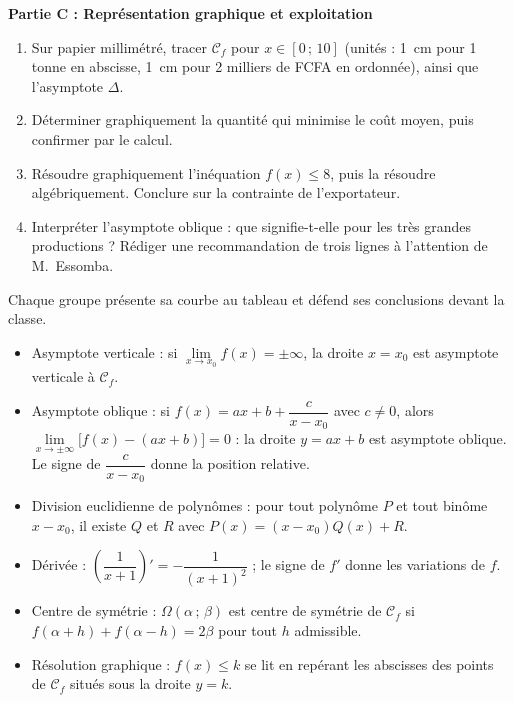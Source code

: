 \documentclass[11pt]{article}
\newcommand{\cle}[1]{{\popxbold\color{popdark}#1}}
\newcounter{popsec}
\newcounter{popsub}
\newcommand{\courssub}[1]{%
  \stepcounter{popsub}%
  \par\vspace{9pt}\noindent{\popxbold\fontsize{11.5}{13}\selectfont\color{popink}{\color{poporange}\thepopsec.\thepopsub}\hspace{6pt}#1}\par\nopagebreak\vspace{4pt}
}
\begin{document}
\textbf{Partie C : Représentation graphique et exploitation}
\begin{enumerate}[resume]
\item Sur papier millimétré, tracer $\mathcal{C}_f$ pour $x \in [0\,;\,10]$ (unités : 1~cm pour 1 tonne en abscisse, 1~cm pour 2 milliers de FCFA en ordonnée), ainsi que l'asymptote $\Delta$.
\item Déterminer graphiquement la quantité qui minimise le coût moyen, puis confirmer par le calcul.
\item Résoudre graphiquement l'inéquation $f(x) \leq 8$, puis la résoudre algébriquement. Conclure sur la contrainte de l'exportateur.
\item Interpréter l'asymptote oblique : que signifie-t-elle pour les très grandes productions ? Rédiger une recommandation de trois lignes à l'attention de M.~Essomba.
\end{enumerate}

Chaque groupe présente sa courbe au tableau et défend ses conclusions devant la classe.

\courssub{Ressources à mobiliser}

\begin{aretenir}
\begin{itemize}
\item \cle{Asymptote verticale} : si $\lim\limits_{x \to x_0} f(x) = \pm\infty$, la droite $x = x_0$ est asymptote verticale à $\mathcal{C}_f$.
\item \cle{Asymptote oblique} : si $f(x) = ax+b+\dfrac{c}{x - x_0}$ avec $c \neq 0$, alors $\lim\limits_{x \to \pm\infty} \big[f(x) - (ax+b)\big] = 0$ : la droite $y = ax+b$ est asymptote oblique. Le signe de $\dfrac{c}{x-x_0}$ donne la position relative.
\item \cle{Division euclidienne} de polynômes : pour tout polynôme $P$ et tout binôme $x - x_0$, il existe $Q$ et $R$ avec $P(x) = (x - x_0)Q(x) + R$.
\item \cle{Dérivée} : $\left(\dfrac{1}{x+1}\right)' = -\dfrac{1}{(x+1)^2}$ ; le signe de $f'$ donne les variations de $f$.
\item \cle{Centre de symétrie} : $\Omega(\alpha\,;\,\beta)$ est centre de symétrie de $\mathcal{C}_f$ si $f(\alpha + h) + f(\alpha - h) = 2\beta$ pour tout $h$ admissible.
\item \cle{Résolution graphique} : $f(x) \leq k$ se lit en repérant les abscisses des points de $\mathcal{C}_f$ situés sous la droite $y = k$.
\end{itemize}
\end{aretenir}
\end{document}
